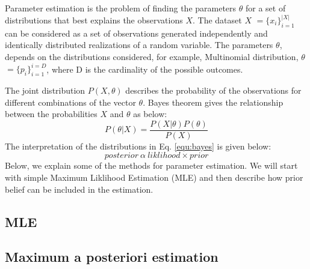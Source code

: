 \label{section:Parameter estimation}
Parameter estimation \cite{Heinrich04parameterestimation} is the problem of finding the parameters $\theta$ for a set of distributions that best explains the observations $X$. 
The dataset $X$ $=\{x_{i}\}_{i=1}^{|X|}$ can be considered as a set of observations generated independently and identically distributed realizations of a random variable. The parameters $\theta$, depends on the distributions considered, for example, Multinomial distribution, $\theta$ $= \{p_{i}\}_{i=1}^{i=D}$, where D is the cardinality of the possible outcomes.

The joint distribution $P(X,\theta)$ describes the probability of the observations for different combinations of the vector $\theta$. Bayes theorem gives the relationship between the probabilities $X$ and $\theta$ as below:
\begin{equation}
\label{equ:bayes}
P(\theta|X) = \frac{P(X|\theta) P(\theta)}{P(X)} 
\end{equation}
The interpretation of the distributions in Eq. \ref{equ:bayes} is given below:
\begin{equation}
posterior ~\alpha \ liklihood \times prior
\end{equation}
Below, we explain some of the methods for parameter estimation. We will start with simple Maximum Liklihood Estimation (MLE) and then describe how prior belief can be included in the estimation. 

\subsection{MLE}
\label{section:MLE}


\subsection{Maximum a posteriori estimation}
